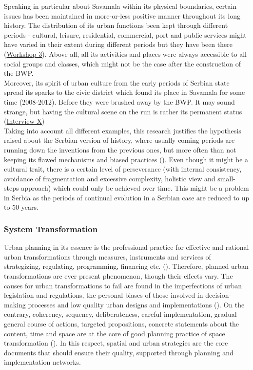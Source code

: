 \documentclass[11pt]{report}
\begin{document}
{Speaking in particular about Savamala within its physical boundaries, certain issues has been maintained in more-or-less positive manner throughout its long history.
The distribution of its urban functions been kept through different periods  - cultural, leisure, residential, commercial, port and public services might have varied in their extent during different periods but they have been there
(\href{Student Workshop}{Workshop 3}).
Above all, all its activities and places were always accessible to all social groups and classes, which might not be the case after the construction of the BWP.
\\

Moreover, its spirit of urban culture from the early periods of Serbian state spread its sparks to the civic district which found its place in Savamala for some time (2008-2012).
Before they were brushed away by the BWP.
It may sound strange, but having the cultural scene on the run is rather its permanent status
(\href{InterviewX}{Interview X})
\\

Taking into account all different examples, this research justifies the hypothesis raised about the Serbian version of history, where usually coming periods are running down the inventions from the previous ones, but more often than not keeping its flawed mechanisms and biased practices (\href{Peric}{\cite{Peric2016}}).
Even though it might be a cultural trait, there is a certain level of perseverance (with internal consistency, avoidance of fragmentation and excessive complexity, holistic view and small-steps approach) which could only be achieved over time.
This might be a problem in Serbia as the periods of continual evolution in a Serbian case are reduced to up to 50 years.
  
\subsubsection{System Transformation}

Urban planning in its essence is the professional practice for effective and rational urban transformations through measures, instruments and services of strategizing, regulating, programming, financing etc.
(\href{Stojkov}{\cite{Stojkov2012}}).
Therefore, planned urban transformations are ever present phenomenon, though their effects vary.
The causes for urban transformations to fail are found in the imperfections  of  urban  legislation  and regulations, the personal biases of those involved in decision-making processes and low quality urban designs and implementations (\href{Grozdanic}{\cite{Grozdanic2008}}).
On the contrary, coherency, sequency,  deliberateness, careful implementation, gradual  general course of actions, targeted propositions, concrete statements about the content, time and space are at the core of good planning practice of space transformation (\cite{Boisiere, 1981 ????}).
In this respect, spatial and urban strategies are the core documents that should ensure their quality, supported through planning and implementation networks.
\\

}
\end{document}
